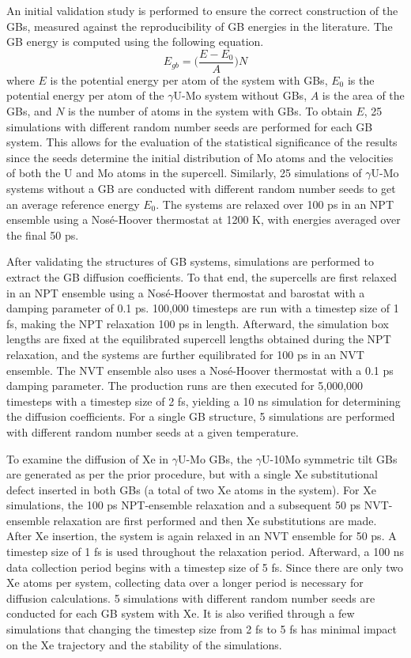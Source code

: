 \documentclass{elsarticle}
\begin{document}
An initial validation study is performed to ensure the correct construction of the GBs, measured against the reproducibility of GB energies in the literature. The GB energy is computed using the following equation.
\begin{equation}
	E_{gb} = \bigg( \frac{E - E_0}{A} \bigg) N
\end{equation}
where $E$ is the potential energy per atom of the system with GBs, $E_0$ is the potential energy per atom of the $\gamma$U-Mo system without GBs, $A$ is the area of the GBs, and $N$ is the number of atoms in the system with GBs. To obtain $E$, 25 simulations with different random number seeds are performed for each GB system. This allows for the evaluation of the statistical significance of the results since the seeds determine the initial distribution of Mo atoms and the velocities of both the U and Mo atoms in the supercell. Similarly, 25 simulations of $\gamma$U-Mo systems without a GB are conducted with different random number seeds to get an average reference energy $E_0$. The systems are relaxed over 100 ps in an NPT ensemble using a Nos\'e-Hoover thermostat at 1200 K, with energies averaged over the final 50 ps.

After validating the structures of GB systems, simulations are performed to extract the GB diffusion coefficients. To that end, the supercells are first relaxed in an NPT ensemble using a Nos\'e-Hoover thermostat and barostat with a damping parameter of 0.1 ps. 100,000 timesteps are run with a timestep size of 1 fs, making the NPT relaxation 100 ps in length. Afterward, the simulation box lengths are fixed at the equilibrated supercell lengths obtained during the NPT relaxation, and the systems are further equilibrated for 100 ps in an NVT ensemble. The NVT ensemble also uses a Nos\'e-Hoover thermostat with a 0.1 ps damping parameter. The production runs are then executed for 5,000,000 timesteps with a timestep size of 2 fs, yielding a 10 ns simulation for determining the diffusion coefficients. For a single GB structure, 5 simulations are performed with different random number seeds at a given temperature.

To examine the diffusion of Xe in $\gamma$U-Mo GBs, the $\gamma$U-10Mo symmetric tilt GBs are generated as per the prior procedure, but with a single Xe substitutional defect inserted in both GBs (a total of two Xe atoms in the system). For Xe simulations, the 100 ps NPT-ensemble relaxation and a subsequent 50 ps NVT-ensemble relaxation are first performed and then Xe substitutions are made. After Xe insertion, the system is again relaxed in an NVT ensemble for 50 ps. A timestep size of 1 fs is used throughout the relaxation period. Afterward, a 100 ns data collection period begins with a timestep size of 5 fs. Since there are only two Xe atoms per system, collecting data over a longer period is necessary for diffusion calculations. 5 simulations with different random number seeds are conducted for each GB system with Xe. It is also verified through a few simulations that changing the timestep size from 2 fs to 5 fs has minimal impact on the Xe trajectory and the stability of the simulations.
\end{document}
